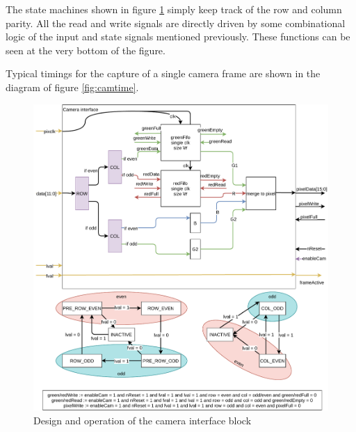 \documentclass[12pt,a4paper]{article}
\begin{document}
The state machines shown in figure \ref{fig:camera} simply keep track of the row and column parity. All the read and write signals are directly driven by some combinational logic of the input and state signals mentioned previously. These functions can be seen at the very bottom of the figure.

Typical timings for the capture of a single camera frame are shown in the diagram of figure \ref{fig:camtime}.

\begin{figure}[ht]
	\centering
	\includegraphics[width=\textwidth]{figures/camera}
	\caption{Design and operation of the camera interface block}
	\label{fig:camera}
\end{figure}
\end{document}
